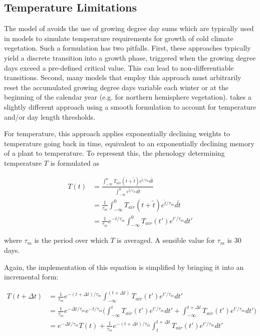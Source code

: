 \documentclass[twoside,10pt]{report}
\begin{document}
\subsection{Temperature Limitations}

The model of \citet{Knorr2010} avoids the use of growing degree day sums which are typically used in models to simulate temperature requirements for growth of cold climate vegetation. Such a formulation has two pitfalls. First, these approaches typically yield a discrete transition into a growth phase, triggered when the growing degree days exceed a pre-defined critical value. This can lead to non-differentiable transitions. Second, many models that employ this approach must arbitrarily reset the accumulated growing degree days variable each winter or at the beginning of the calendar year (e.g. for northern hemisphere vegetation). \citet{Knorr2010} takes a slightly different approach using a smooth formulation to account for temperature and/or day length thresholds. 

For temperature, this approach applies exponentially declining weights to temperature going back in time, equivalent to an exponentially declining memory of a plant to temperature. To represent this, the phenology determining temperature $T$ is formulated as

\begin{equation}
\label{e:phenology_lai_temp}
\begin{split}
    T(t) & = \frac{ \int_{-\infty}^{0} T_{air} (t+\tilde{t}) e^{\tilde{t} / \tau_m} d \tilde{t} }{ \int_{-\infty}^{0} e^{\tilde{t} / \tau_m} d \tilde{t}}  \\
    & = \frac{1}{ \tau_m } \int_{-\infty}^{0} T_{air} (t + \tilde{t}) e^{\tilde{t} / \tau_m} d \tilde{t} \\
    & = \frac{1}{ \tau_m } e^{-t / \tau_m}  \int_{-\infty}^{0} T_{air} (t') e^{t' / \tau_m} d t'
\end{split}
\end{equation}

where $\tau_m$ is the period over which $T$ is averaged. A sensible value for $\tau_m$ is 30 days. 

Again, the implementation of this equation is simplified by bringing it into an incremental form:

\begin{equation}
\label{e:phenology_lai_temp_incremental}
\begin{split}
    T(t+\Delta t) & = \frac{1}{ \tau_m } e^{-(t+\Delta t) / \tau_m}  \int_{-\infty}^{(t+\Delta t)} T_{air} (t') e^{t' / \tau_m} d t'  \\
    & = \frac{1}{ \tau_m } e^{-\Delta t / \tau_m} e^{-t / \tau_m} \bigg( \int_{-\infty}^{t} T_{air} (t') e^{t'/ \tau_m} d t' + \int_{-\infty}^{t+\Delta t} T_{air} (t') e^{t'/ \tau_m} d t' \bigg) \\
    & = e^{-\Delta t / \tau_m} T(t) + \frac{1}{ \tau_m } e^{-(t+\Delta t) / \tau_m} \int_{t}^{t+\Delta t} T_{air} (t') e^{t'/ \tau_m} d t' \\
\end{split}
\end{equation}
\end{document}

